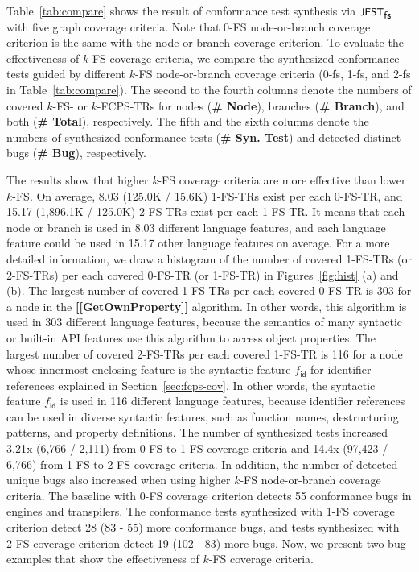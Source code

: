 \documentclass[acmsmall,review,screen]{acmart}
\newcommand{\name}[1]{\textsf{#1}}
\newcommand{\sname}[1]{\name{\small #1}}
\newcommand{\jest}{\sname{JEST}}
\newcommand{\tool}{\jest_{\sname{fs}}}
\newcommand{\feat}{f}
\newcommand{\idfeat}{\feat_{\name{id}}}
\begin{document}

Table~\ref{tab:compare} shows the result of conformance test synthesis via
$\tool$ with five graph coverage criteria.
%
Note that 0-FS node-or-branch coverage criterion is the same with the node-or-branch
coverage criterion.
%
To evaluate the effectiveness of $k$-FS coverage criteria, we compare the synthesized
conformance tests guided by different $k$-FS node-or-branch coverage criteria
(\sname{0-fs}, \sname{1-fs}, and \sname{2-fs} in Table~\ref{tab:compare}).
%
The second to the fourth columns denote the numbers of covered $k$-FS- or $k$-FCPS-TRs for
nodes (\textbf{\small \# Node}), branches (\textbf{\small \# Branch}), and both
(\textbf{\small \# Total}), respectively.
%
The fifth and the sixth columns denote the numbers of synthesized conformance tests
(\textbf{\small\# Syn. Test}) and detected distinct bugs
(\textbf{\small\# Bug}), respectively.


The results show that higher $k$-FS coverage criteria are more
effective than lower $k$-FS.
On average, 8.03 (125.0K / 15.6K) 1-FS-TRs exist per each 0-FS-TR, and 15.17 (1,896.1K
/ 125.0K) 2-FS-TRs exist per each 1-FS-TR.
%
It means that each node or branch is used in 8.03 different language features,
and each language feature could be used in 15.17 other language features on average.
%
For a more detailed information, we draw a histogram of the number of covered
1-FS-TRs (or 2-FS-TRs) per each covered 0-FS-TR (or 1-FS-TR) in
Figures~\ref{fig:hist} (a) and (b).
%
The largest number of covered 1-FS-TRs per each covered 0-FS-TR is 303
for a node in the \textbf{[[GetOwnProperty]]} algorithm.
%
In other words, this algorithm is used in 303 different language features,
because the semantics of many syntactic or built-in API features use
this algorithm to access object properties.
%
The largest number of covered 2-FS-TRs per each covered 1-FS-TR is 116
for a node whose innermost enclosing feature is the syntactic feature $\idfeat$
for identifier references explained in Section~\ref{sec:fcps-cov}.
%
In other words, the syntactic feature $\idfeat$ is used in 116 different
language features, because identifier references can be used in
diverse syntactic features, such as function names, destructuring
patterns, and property definitions.
%
The number of synthesized tests increased 3.21x (6,766 / 2,111) from 0-FS to
1-FS coverage criteria and 14.4x (97,423 / 6,766) from 1-FS to 2-FS coverage
criteria.
%
In addition, the number of detected unique bugs also increased when using higher
$k$-FS node-or-branch coverage criteria.
%
The baseline with 0-FS coverage criterion detects 55 conformance bugs in engines
and transpilers.
%
The conformance tests synthesized with 1-FS coverage criterion detect 28
(83 - 55) more conformance bugs, and tests synthesized with 2-FS coverage
criterion detect 19 (102 - 83) more bugs.
%
Now, we present two bug examples that show the effectiveness of $k$-FS coverage
criteria.
\end{document}
